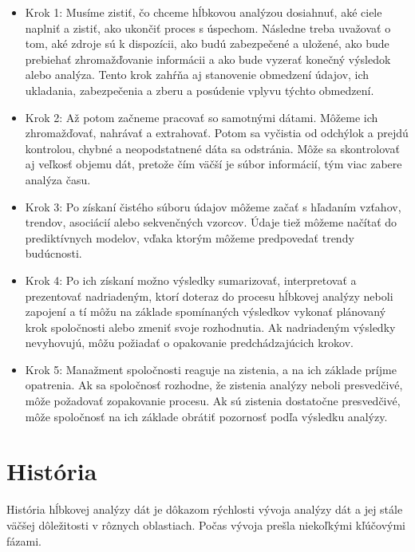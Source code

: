\documentclass[10pt,twoside,slovak,a4paper]{article}
\begin{document}
\begin{itemize}
\item Krok 1: Musíme zistiť, čo chceme hĺbkovou analýzou dosiahnuť, aké ciele naplniť a zistiť, ako ukončiť proces s úspechom. Následne treba uvažovať o tom, aké zdroje sú k dispozícii, ako budú zabezpečené a uložené, ako bude prebiehať zhromažďovanie informácii a ako bude vyzerať konečný výsledok alebo analýza. Tento krok zahŕňa aj stanovenie obmedzení údajov, ich ukladania, zabezpečenia a zberu a posúdenie vplyvu týchto obmedzení. \\
\item Krok 2: Až potom začneme pracovať so samotnými dátami. Môžeme ich zhromažďovať, nahrávať a extrahovať. Potom sa vyčistia od odchýlok a prejdú kontrolou, chybné a neopodstatnené dáta sa odstránia. Môže sa skontrolovať aj veľkosť objemu dát, pretože čím väčší je súbor informácií, tým viac zabere analýza času. \\
\item Krok 3: Po získaní čistého súboru údajov môžeme začať s hľadaním vzťahov, trendov, asociácií alebo sekvenčných vzorcov. Údaje tiež môžeme načítať do prediktívnych modelov, vďaka ktorým môžeme predpovedať trendy budúcnosti. \\
\item Krok 4: Po ich získaní možno výsledky sumarizovať, interpretovať a prezentovať nadriadeným, ktorí doteraz do procesu hĺbkovej analýzy neboli zapojení a tí môžu na základe spomínaných výsledkov vykonať plánovaný krok spoločnosti alebo zmeniť svoje rozhodnutia. Ak nadriadeným výsledky nevyhovujú, môžu požiadať o opakovanie predchádzajúcich krokov.\\
\item Krok 5: Manažment spoločnosti reaguje na zistenia, a na ich základe príjme opatrenia. Ak sa spoločnosť rozhodne, že zistenia analýzy neboli  presvedčivé, môže požadovať zopakovanie procesu. Ak sú zistenia dostatočne presvedčivé, môže spoločnosť na ich základe obrátiť pozornosť podľa výsledku analýzy.\cite{CraigSTD}\cite{IBM}\\
\end{itemize}

\section{História}
História hĺbkovej analýzy dát je dôkazom rýchlosti vývoja analýzy dát a jej stále väčšej dôležitosti v rôznych oblastiach. Počas vývoja prešla niekoľkými kľúčovými fázami.
\end{document}
